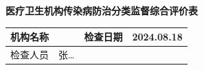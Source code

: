 \documentclass[UTF8,10pt,a4paper,fontset=fandol]{ctexart}
\newcommand{\fieldvalue}[1]{#1}
\newcommand{\handwritten}[1]{#1}
\begin{document}

\newpage

\begin{center}
\textbf{医疗卫生机构传染病防治分类监督综合评价表}\\
\end{center}

\noindent
\begin{tabularx}{\textwidth}{|l|X|l|l|}
\hline
机构名称 & & 检查日期 & 
\fieldvalue{\handwritten{2024.08.18}}\\
\hline
检查人员 & 
\fieldvalue{\handwritten{张\ldots}} & & \\
\hline
\end{tabularx}

\vspace{0.5em}
\end{document}
